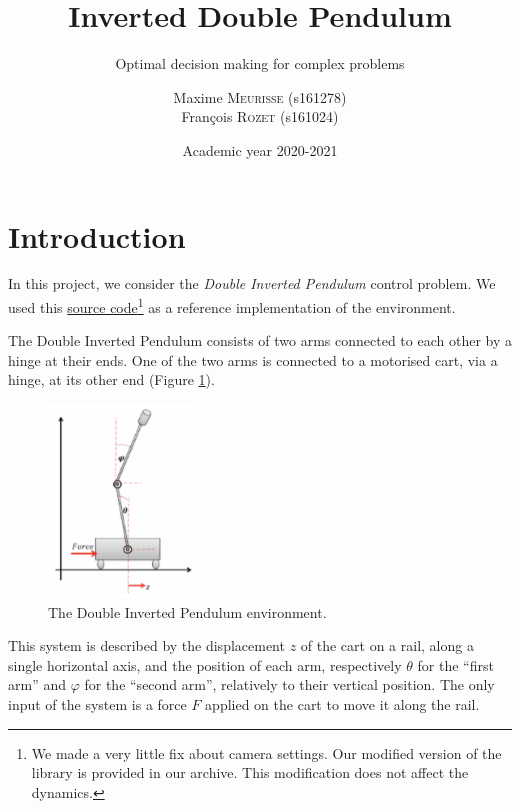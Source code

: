 \documentclass[a4paper, 12pt]{article}
\institute{University of Liège}
\title{Inverted Double Pendulum}
\subtitle{Optimal decision making for complex problems}
\author{%
Maxime \textsc{Meurisse} (s161278)\\%
François \textsc{Rozet} (s161024)%
}
\date{Academic year 2020-2021}
\begin{document}
    \maketitle
    
    \section*{Introduction}
    
    In this project, we consider the \emph{Double Inverted Pendulum} control problem. We used this \href{https://github.com/benelot/pybullet-gym/blob/master/pybulletgym/envs/roboschool/envs/pendulum/inverted_double_pendulum_env.py}{source code}\footnote{We made a very little fix about camera settings. Our modified version of the library is provided in our archive. This modification does not affect the dynamics.} as a reference implementation of the environment.
    
    The Double Inverted Pendulum consists of two arms connected to each other by a hinge at their ends. One of the two arms is connected to a motorised cart, via a hinge, at its other end (Figure \ref{fig:domain.environment}).
    
    \begin{figure}[H]
        \centering
        \includegraphics[width=0.35\textwidth]{resources/png/environment.png}
        \caption{The Double Inverted Pendulum environment.}
        \label{fig:domain.environment}
    \end{figure}
    
    This system is described by the displacement $z$ of the cart on a rail, along a single horizontal axis, and the position of each arm, respectively $\theta$ for the \enquote{first arm} and $\varphi$ for the \enquote{second arm}, relatively to their vertical position. The only input of the system is a force $F$ applied on the cart to move it along the rail.
    
\end{document}
